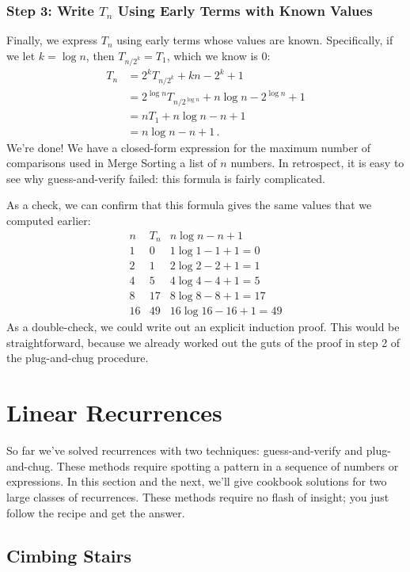 \subsubsection*{Step 3:  Write $T_n$ Using Early Terms with Known Values}

Finally, we express $T_n$ using early terms whose values are known.
Specifically, if we let $k = \log n$, then $T_{n/2^k} = T_1$, which we
know is 0:
\begin{align*}
T_n & = 2^k T_{n/2^k} + kn - 2^k + 1 \\
  & = 2^{\log n} T_{n/2^{\log n}} + n \log n - 2^{\log n} + 1 \\
  & = n T_1 + n \log n - n + 1 \\
  & = n \log n - n + 1\, .
\end{align*}
We're done!  We have a closed-form expression for the maximum number
of comparisons used in Merge Sorting a list of $n$ numbers.  In
retrospect, it is easy to see why guess-and-verify failed:  this
formula is fairly complicated.

As a check, we can confirm that this formula gives the same values
that we computed earlier:
\[
\begin{array}{c|c|c}
n & T_n & n \log n - n + 1 \\ \hline
1 & 0 & 1 \log 1 - 1 + 1 = 0 \\
2 & 1 & 2 \log 2 - 2 + 1 = 1 \\
4 & 5 & 4 \log 4 - 4 + 1 = 5 \\
8 & 17 & 8 \log 8 - 8 + 1 = 17 \\
16 & 49 & 16 \log 16 - 16 + 1 = 49
\end{array}
\]
As a double-check, we could write out an explicit induction proof.
This would be straightforward, because we already worked out the guts
of the proof in step 2 of the plug-and-chug procedure.

\section{Linear Recurrences}

So far we've solved recurrences with two techniques: guess-and-verify
and plug-and-chug.  These methods require spotting a pattern in a
sequence of numbers or expressions.  In this section and the next,
we'll give cookbook solutions for two large classes of recurrences.
These methods require no flash of insight; you just follow the recipe
and get the answer.

\subsection{Cimbing Stairs}

